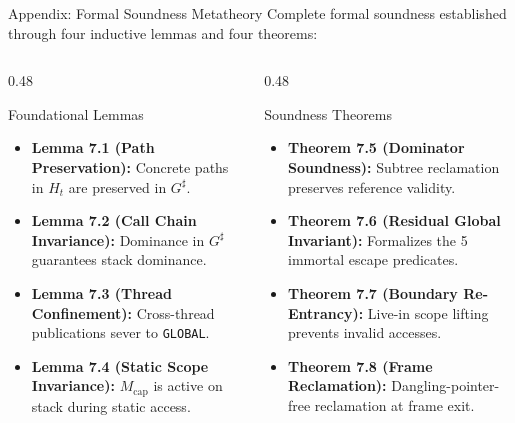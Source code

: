 \documentclass[11pt]{beamer}
\begin{document}
\begin{frame}{Appendix: Formal Soundness Metatheory}
  \small Complete formal soundness established through four inductive lemmas and four theorems:
  \vspace{0.1em}
  
  \begin{columns}[T]
    \begin{column}{0.48\textwidth}
      \begin{block}{Foundational Lemmas}
        \scriptsize
        \begin{itemize}\setlength{\itemsep}{1pt}
          \item \textbf{Lemma 7.1 (Path Preservation):} Concrete paths in $H_t$ are preserved in $G^\sharp$.
          \item \textbf{Lemma 7.2 (Call Chain Invariance):} Dominance in $G^\sharp$ guarantees stack dominance.
          \item \textbf{Lemma 7.3 (Thread Confinement):} Cross-thread publications sever to \texttt{GLOBAL}.
          \item \textbf{Lemma 7.4 (Static Scope Invariance):} $M_{\text{cap}}$ is active on stack during static access.
        \end{itemize}
      \end{block}
    \end{column}
    \begin{column}{0.48\textwidth}
      \begin{block}{Soundness Theorems}
        \scriptsize
        \begin{itemize}\setlength{\itemsep}{1pt}
          \item \textbf{Theorem 7.5 (Dominator Soundness):} Subtree reclamation preserves reference validity.
          \item \textbf{Theorem 7.6 (Residual Global Invariant):} Formalizes the 5 immortal escape predicates.
          \item \textbf{Theorem 7.7 (Boundary Re-Entrancy):} Live-in scope lifting prevents invalid accesses.
          \item \textbf{Theorem 7.8 (Frame Reclamation):} Dangling-pointer-free reclamation at frame exit.
        \end{itemize}
      \end{block}
    \end{column}
  \end{columns}
\end{frame}
\end{document}
